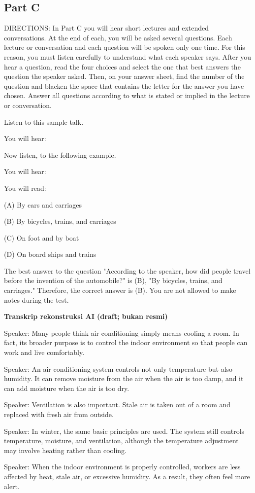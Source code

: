 \documentclass[12pt]{article}
\begin{document}
\subsection*{Part C}
DIRECTIONS: In Part C you will hear short lectures and extended conversations. At the end of each, you will be asked several questions. Each lecture or conversation and each question will be spoken only one time. For this reason, you must listen carefully to understand what each speaker says. After you hear a question, read the four choices and select the one that best answers the question the speaker asked. Then, on your answer sheet, find the number of the question and blacken the space that contains the letter for the answer you have chosen. Answer all questions according to what is stated or implied in the lecture or conversation.\par
\begin{exampleblock}
Listen to this sample talk.\par
You will hear:\par
Now listen, to the following example.\par
You will hear:\par
You will read:\par
(A) By cars and carriages\par
(B) By bicycles, trains, and carriages\par
(C) On foot and by boat\par
(D) On board ships and trains\par
The best answer to the question "According to the speaker, how did people travel before the invention of the automobile?" is (B), "By bicycles, trains, and carriages." Therefore, the correct answer is (B). You are not allowed to make notes during the test.\par
\end{exampleblock}
\begin{exampleblock}
\textbf{Transkrip rekonstruksi AI (draft; bukan resmi)}\par
Speaker: Many people think air conditioning simply means cooling a room. In fact, its broader purpose is to control the indoor environment so that people can work and live comfortably.\par
Speaker: An air-conditioning system controls not only temperature but also humidity. It can remove moisture from the air when the air is too damp, and it can add moisture when the air is too dry.\par
Speaker: Ventilation is also important. Stale air is taken out of a room and replaced with fresh air from outside.\par
Speaker: In winter, the same basic principles are used. The system still controls temperature, moisture, and ventilation, although the temperature adjustment may involve heating rather than cooling.\par
Speaker: When the indoor environment is properly controlled, workers are less affected by heat, stale air, or excessive humidity. As a result, they often feel more alert.\par
\end{exampleblock}
\end{document}
